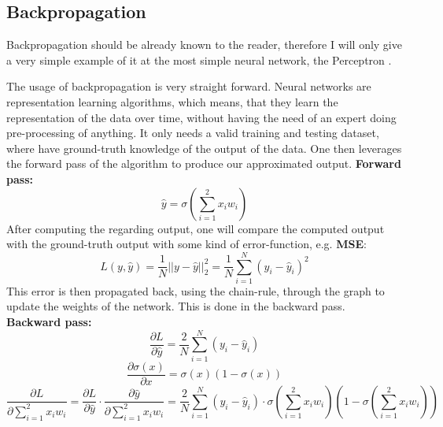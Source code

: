  \subsection{Backpropagation} \label{subsection::backpropagation}
  Backpropagation should be already known to the reader, therefore I will only give a very simple example of it at the most simple neural network, the Perceptron \cite{Rosenblatt1957}.
  \begin{center}
  \end{center}
  The usage of backpropagation is very straight forward. Neural networks are representation learning algorithms, which means, that they learn the representation of the data over time, without
  having the need of an expert doing pre-processing of anything. It only needs a valid training and testing dataset, where have ground-truth knowledge of the output of the data. One then leverages
  the forward pass of the algorithm to produce our approximated output.
  \textbf{Forward pass:}
  \begin{equation}
   \hat{y} = \sigma(\sum_{i=1}^{2}x_iw_i)
  \end{equation}
  After computing the regarding output, one will compare the computed output with the ground-truth output with some kind of error-function, e.g. \textbf{MSE}:
  \begin{equation}
   L(y,\hat{y}) = \frac{1}{N}||y-\hat{y}||_2^2 = \frac{1}{N}\sum_{i=1}^{N}(y_i-\hat{y}_i)^2
  \end{equation}    
  This error is then propagated back, using the chain-rule, through the
  graph to update the weights of the network. This is done in the backward pass.\\
  \textbf{Backward pass:}
  \begin{equation}
   \frac{\partial L}{\partial \hat{y}} = \frac{2}{N}\sum_{i=1}^{N}(y_i-\hat{y}_i)
  \end{equation}
  \begin{equation}
   \frac{\partial \sigma(x)}{\partial x} = \sigma(x)(1-\sigma(x))
  \end{equation}
  \begin{equation}
   \frac{\partial L}{\partial \sum_{i=1}^{2}x_iw_i} = \frac{\partial L}{\partial \hat{y}} \cdot \frac{\partial \hat{y}}{\partial \sum_{i=1}^{2}x_iw_i} = \frac{2}{N}\sum_{i=1}^{N}(y_i-\hat{y}_i) \cdot
   \sigma(\sum_{i=1}^{2}x_iw_i)(1-\sigma(\sum_{i=1}^{2}x_iw_i))
  \end{equation}
 
